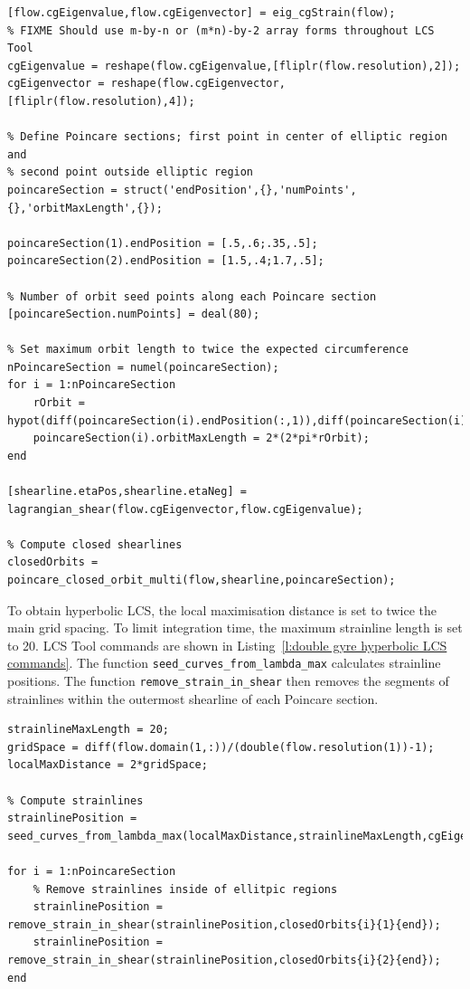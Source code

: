 \documentclass{article}
\begin{document}
\begin{lstlisting}[caption={Double gyre shear LCS detection commands. Subset of \texttt{hyperbolic\_shear\_lcs.m}.},label=l:double gyre shear LCS commands,firstnumber=24]
% Compute Cauchy-Green strain eigenvalues and eigenvectors
[flow.cgEigenvalue,flow.cgEigenvector] = eig_cgStrain(flow);
% FIXME Should use m-by-n or (m*n)-by-2 array forms throughout LCS Tool
cgEigenvalue = reshape(flow.cgEigenvalue,[fliplr(flow.resolution),2]);
cgEigenvector = reshape(flow.cgEigenvector,[fliplr(flow.resolution),4]);

% Define Poincare sections; first point in center of elliptic region and
% second point outside elliptic region
poincareSection = struct('endPosition',{},'numPoints',{},'orbitMaxLength',{});

poincareSection(1).endPosition = [.5,.6;.35,.5];
poincareSection(2).endPosition = [1.5,.4;1.7,.5];

% Number of orbit seed points along each Poincare section
[poincareSection.numPoints] = deal(80);

% Set maximum orbit length to twice the expected circumference
nPoincareSection = numel(poincareSection);
for i = 1:nPoincareSection
    rOrbit = hypot(diff(poincareSection(i).endPosition(:,1)),diff(poincareSection(i).endPosition(:,2)));
    poincareSection(i).orbitMaxLength = 2*(2*pi*rOrbit);
end

[shearline.etaPos,shearline.etaNeg] = lagrangian_shear(flow.cgEigenvector,flow.cgEigenvalue);

% Compute closed shearlines
closedOrbits = poincare_closed_orbit_multi(flow,shearline,poincareSection);
\end{lstlisting}

To obtain hyperbolic LCS, the local maximisation distance is set to twice the main grid spacing. To limit integration time, the maximum strainline length is set to 20. LCS Tool commands are shown in Listing~\ref{l:double gyre hyperbolic LCS commands}. The function \texttt{seed\_curves\_from\_lambda\_max} calculates strainline positions. The function \texttt{remove\_strain\_in\_shear} then removes the segments of strainlines within the outermost shearline of each Poincare section.

\begin{lstlisting}[caption={Double gyre hyperbolic LCS detection commands. Subset of \texttt{hyperbolic\_shear\_lcs.m}.},label=l:double gyre hyperbolic LCS commands,firstnumber=60]
strainlineMaxLength = 20;
gridSpace = diff(flow.domain(1,:))/(double(flow.resolution(1))-1);
localMaxDistance = 2*gridSpace;

% Compute strainlines
strainlinePosition = seed_curves_from_lambda_max(localMaxDistance,strainlineMaxLength,cgEigenvalue(:,:,2),cgEigenvector(:,:,1:2),flow.domain);

for i = 1:nPoincareSection
    % Remove strainlines inside of ellitpic regions
    strainlinePosition = remove_strain_in_shear(strainlinePosition,closedOrbits{i}{1}{end});
    strainlinePosition = remove_strain_in_shear(strainlinePosition,closedOrbits{i}{2}{end});
end
\end{lstlisting}
\end{document}
